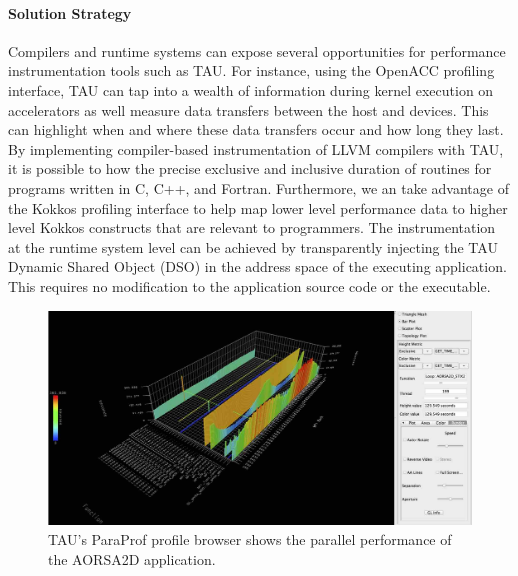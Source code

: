 \paragraph{Solution Strategy} Compilers and runtime systems can expose several opportunities for performance instrumentation tools such as TAU.  For instance, using the OpenACC profiling interface, TAU can tap into a wealth of information during kernel execution on accelerators as well measure data transfers between the host and devices. This can highlight when and where these data transfers occur and how long they last.  By implementing compiler-based instrumentation of LLVM compilers with TAU, it is possible to how the precise exclusive and inclusive duration of routines for programs written in C, C++, and Fortran.  Furthermore, we an take advantage of the Kokkos profiling interface to help map lower level performance data to higher level Kokkos constructs that are relevant to programmers. The instrumentation at the runtime system level can be achieved by transparently injecting the TAU Dynamic Shared Object (DSO) in the address space of the executing application. This requires no modification to the application source code or the executable. 

\begin{figure}[htb]
\centering
\includegraphics[width=5in]{projects/2.3.2-Tools/2.3.2.09-PROTEAS/tau-3d}
\caption{
  TAU's ParaProf profile browser shows the parallel performance of the AORSA2D application.
}
\label{figure:tau}
\end{figure}

